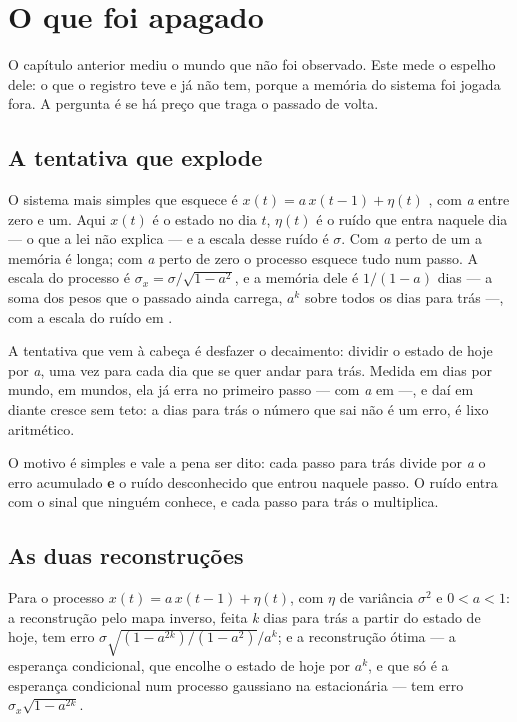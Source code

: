 \chapter{O que foi apagado}\label{cap:apagado}

O capítulo anterior mediu o mundo que não foi observado. Este mede o espelho dele: o que o registro
teve e já não tem, porque a memória do sistema foi jogada fora. A pergunta é se há preço que traga o
passado de volta.

\section{A tentativa que explode}

O sistema mais simples que esquece é $x(t) = a\,x(t-1) + \eta(t)$ \cite{box2008time}, com \emph{a} entre zero e
um. Aqui $x(t)$ é o estado no dia $t$, $\eta(t)$ é o ruído que entra naquele dia --- o que a lei não
explica --- e a escala desse ruído é $\sigma$.
Com \emph{a} perto de um a memória é longa; com \emph{a} perto de zero o processo esquece tudo num
passo. A escala do processo é $\sigma_x = \sigma/\sqrt{1-a^2}$, e a memória dele é $1/(1-a)$ dias --- a soma
dos pesos que o passado ainda carrega, $a^{k}$ sobre todos os dias para trás ---, com a escala do
ruído em \numApagadoSigma{}.

A tentativa que vem à cabeça é desfazer o decaimento: dividir o estado de hoje por \emph{a}, uma vez
para cada dia que se quer andar para trás. Medida em \numApagadoDias{} dias por mundo, em
\numApagadoSementes{} mundos, ela já erra no primeiro passo --- \numApagadoInversoNoventaCentesimos{}
com \emph{a} em \numApagadoADoTeste{} ---, e daí em diante cresce sem teto: a
\numApagadoDiasMaior{} dias para trás o número que sai não é um erro, é lixo aritmético.

O motivo é simples e vale a pena ser dito: cada passo para trás divide por \emph{a} o erro
acumulado \textbf{e} o ruído desconhecido que entrou naquele passo. O ruído entra com o sinal que ninguém conhece, e
cada passo para trás o multiplica.

\section{As duas reconstruções}

\begin{proposicao}\label{prop:reconstrucao}
Para o processo $x(t) = a\,x(t-1) + \eta(t)$, com $\eta$ de variância $\sigma^2$ e $0<a<1$:
a reconstrução pelo mapa inverso, feita \emph{k} dias para trás a partir do estado de hoje, tem erro
\quad $\sigma\sqrt{(1-a^{2k})/(1-a^2)}\big/a^{k}$; \quad e a reconstrução ótima --- a esperança
condicional, que encolhe o estado de hoje por $a^{k}$, e que só é a esperança condicional num processo
gaussiano na estacionária --- tem erro $\sigma_x\sqrt{1-a^{2k}}$.
\end{proposicao}

